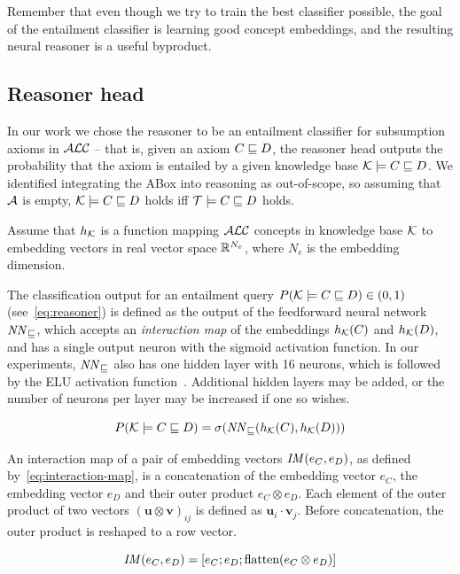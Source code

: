 Remember that even though we try to train the best classifier possible, the goal of the entailment classifier is learning good concept embeddings, and the resulting neural reasoner is a useful byproduct.

\subsection{Reasoner head}

In our work we chose the reasoner to be an entailment classifier for subsumption axioms in $\mathcal{ALC}$ -- that is, given an axiom $C \sqsubseteq D$, the reasoner head outputs the probability that the axiom is entailed by a given knowledge base $\mathcal{K} \models C \sqsubseteq D$.
We identified integrating the ABox into reasoning as out-of-scope, so assuming that $\mathcal{A}$ is empty, $\mathcal{K} \models C \sqsubseteq D$ holds iff $\mathcal{T} \models C \sqsubseteq D$ holds.

Assume that $h_{\mathcal{K}}$ is a function mapping $\mathcal{ALC}$ concepts in knowledge base $\mathcal{K}$ to embedding vectors in real vector space $\mathbb{R}^{N_e}$, where $N_e$ is the embedding dimension.

The classification output for an entailment query $P(\mathcal{K} \models C \sqsubseteq D) \in (0, 1)$ (see~\autoref{eq:reasoner}) is defined as the output of the feedforward neural network $\mathit{NN}_\sqsubseteq$, which accepts an \emph{interaction map} of the embeddings $h_{\mathcal{K}}(C)$ and $h_{\mathcal{K}}(D)$, and has a single output neuron with the sigmoid activation function.
In our experiments, $\mathit{NN}_\sqsubseteq$ also has one hidden layer with 16 neurons, which is followed by the ELU activation function~\cite{clevert_fast_2016}.
Additional hidden layers may be added, or the number of neurons per layer may be increased if one so wishes.

\begin{equation}
\label{eq:reasoner}
    P(\mathcal{K} \models C \sqsubseteq D) = \sigma(\mathit{NN}_\sqsubseteq(h_{\mathcal{K}}(C), h_{\mathcal{K}}(D)))
\end{equation}

An interaction map of a pair of embedding vectors $\mathit{IM}(e_C, e_D)$, as defined by~\autoref{eq:interaction-map}, is a concatenation of the embedding vector $e_C$, the embedding vector $e_D$ and their outer product $e_C \otimes e_D$.
Each element of the outer product of two vectors $(\mathbf u \otimes \mathbf v)_{ij}$ is defined as $\mathbf u_i \cdot \mathbf v_j$.
Before concatenation, the outer product is reshaped to a row vector.

\begin{equation}
\label{eq:interaction-map}
    \mathit{IM}(e_C, e_D) = [ e_C; e_D; \text{flatten}(e_C \otimes e_D) ]
\end{equation}

